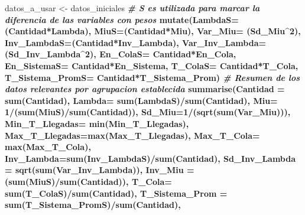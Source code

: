 \documentclass[]{article}
\newenvironment{Shaded}{\begin{snugshade}}{\end{snugshade}}
\newcommand{\CommentTok}[1]{\textcolor[rgb]{0.56,0.35,0.01}{\textit{#1}}}
\newcommand{\DataTypeTok}[1]{\textcolor[rgb]{0.13,0.29,0.53}{#1}}
\newcommand{\DecValTok}[1]{\textcolor[rgb]{0.00,0.00,0.81}{#1}}
\newcommand{\KeywordTok}[1]{\textcolor[rgb]{0.13,0.29,0.53}{\textbf{#1}}}
\newcommand{\NormalTok}[1]{#1}
\newcommand{\OperatorTok}[1]{\textcolor[rgb]{0.81,0.36,0.00}{\textbf{#1}}}
\newcommand{\StringTok}[1]{\textcolor[rgb]{0.31,0.60,0.02}{#1}}
\begin{document}
\begin{Shaded}
\begin{Highlighting}[]
\NormalTok{datos_a_usar <-}\StringTok{ }\NormalTok{datos_iniciales }\OperatorTok{%>%}
\StringTok{  }\CommentTok{# S es utilizada para marcar la diferencia de las variables con pesos}
\StringTok{  }\KeywordTok{mutate}\NormalTok{(}\DataTypeTok{LambdaS=}\NormalTok{(Cantidad}\OperatorTok{*}\NormalTok{Lambda), }\DataTypeTok{MiuS=}\NormalTok{(Cantidad}\OperatorTok{*}\NormalTok{Miu), }\DataTypeTok{Var_Miu=}\NormalTok{ (Sd_Miu}\OperatorTok{^}\DecValTok{2}\NormalTok{), }\DataTypeTok{Inv_LambdaS=}\NormalTok{(Cantidad}\OperatorTok{*}\NormalTok{Inv_Lambda), }
         \DataTypeTok{Var_Inv_Lambda=}\NormalTok{(Sd_Inv_Lambda}\OperatorTok{^}\DecValTok{2}\NormalTok{), }\DataTypeTok{En_ColaS=}\NormalTok{ Cantidad}\OperatorTok{*}\NormalTok{En_Cola, }\DataTypeTok{En_SistemaS=}\NormalTok{ Cantidad}\OperatorTok{*}\NormalTok{En_Sistema,}
         \DataTypeTok{T_ColaS=}\NormalTok{ Cantidad}\OperatorTok{*}\NormalTok{T_Cola, }\DataTypeTok{T_Sistema_PromS=}\NormalTok{ Cantidad}\OperatorTok{*}\NormalTok{T_Sistema_Prom) }\OperatorTok{%>%}\StringTok{ }\KeywordTok{group_by}\NormalTok{(CC, Restaurante, FinDe) }\OperatorTok{%>%}\StringTok{ }
\StringTok{  }\CommentTok{# Resumen de los datos relevantes por agrupacion establecida}
\StringTok{  }\KeywordTok{summarise}\NormalTok{(}\DataTypeTok{Cantidad =} \KeywordTok{sum}\NormalTok{(Cantidad), }\DataTypeTok{Lambda=} \KeywordTok{sum}\NormalTok{(LambdaS)}\OperatorTok{/}\KeywordTok{sum}\NormalTok{(Cantidad),}
            \DataTypeTok{Miu=} \DecValTok{1}\OperatorTok{/}\NormalTok{(}\KeywordTok{sum}\NormalTok{(MiuS)}\OperatorTok{/}\KeywordTok{sum}\NormalTok{(Cantidad)), }\DataTypeTok{Sd_Miu=}\DecValTok{1}\OperatorTok{/}\NormalTok{(}\KeywordTok{sqrt}\NormalTok{(}\KeywordTok{sum}\NormalTok{(Var_Miu))), }
            \DataTypeTok{Min_T_Llegadas=} \KeywordTok{min}\NormalTok{(Min_T_Llegadas), }\DataTypeTok{Max_T_Llegadas=}\KeywordTok{max}\NormalTok{(Max_T_Llegadas), }\DataTypeTok{Max_T_Cola=} \KeywordTok{max}\NormalTok{(Max_T_Cola),}
            \DataTypeTok{Inv_Lambda=}\KeywordTok{sum}\NormalTok{(Inv_LambdaS)}\OperatorTok{/}\KeywordTok{sum}\NormalTok{(Cantidad), }\DataTypeTok{Sd_Inv_Lambda =} \KeywordTok{sqrt}\NormalTok{(}\KeywordTok{sum}\NormalTok{(Var_Inv_Lambda)),}
            \DataTypeTok{Inv_Miu =}\NormalTok{ (}\KeywordTok{sum}\NormalTok{(MiuS)}\OperatorTok{/}\KeywordTok{sum}\NormalTok{(Cantidad)),}
            \DataTypeTok{T_Cola=} \KeywordTok{sum}\NormalTok{(T_ColaS)}\OperatorTok{/}\KeywordTok{sum}\NormalTok{(Cantidad), }\DataTypeTok{T_Sistema_Prom =} \KeywordTok{sum}\NormalTok{(T_Sistema_PromS)}\OperatorTok{/}\KeywordTok{sum}\NormalTok{(Cantidad),}
}}
\end{Highlighting}
\end{Shaded}
\end{document}
